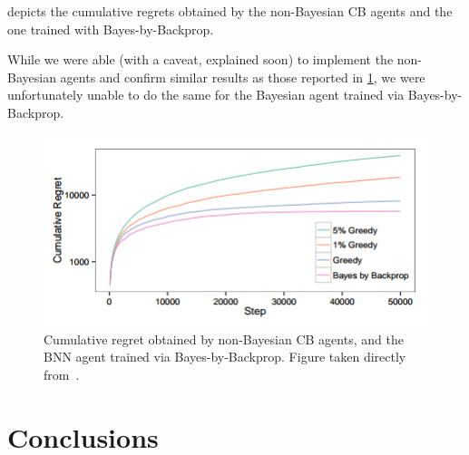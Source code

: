 \documentclass[11pt]{article}
\begin{document}
 depicts the cumulative regrets obtained by the
non-Bayesian CB agents and the one trained with Bayes-by-Backprop.  

While we were able (with a caveat, explained soon) to implement the
non-Bayesian agents and confirm similar results as those reported in
\cref{fig:cb_cumregret}, we were unfortunately unable to do the same for the
Bayesian agent trained via Bayes-by-Backprop.



\begin{figure}
  \centering\includegraphics[width=.5\textwidth]{figures/cb_cumregret.png}
  \caption{Cumulative regret obtained by non-Bayesian CB agents, and the BNN
  agent trained via Bayes-by-Backprop.  Figure taken directly
  from~\cite{blarg}.}\label{fig:cb_cumregret}
\end{figure}


\section{Conclusions}
\end{document}
